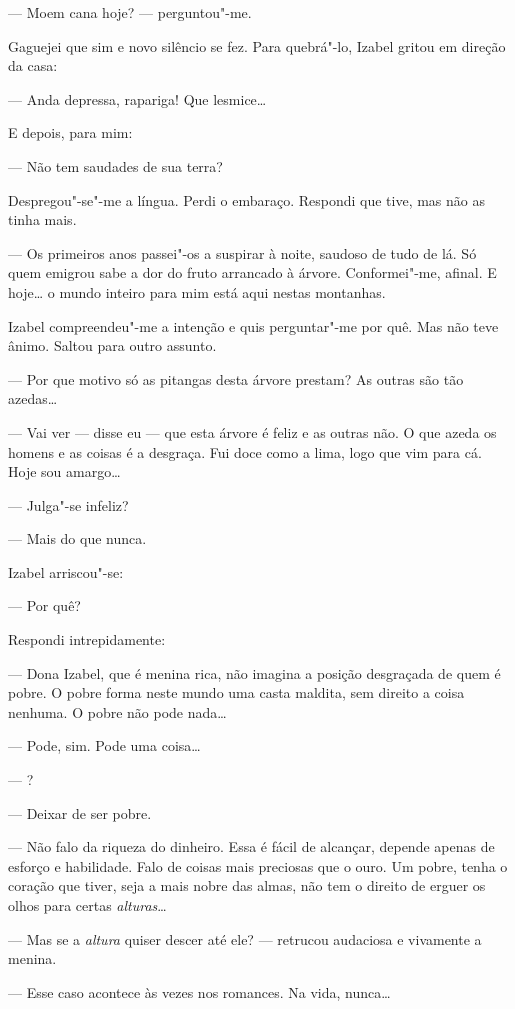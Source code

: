 --- Moem cana hoje? --- perguntou"-me.

Gaguejei que sim e novo silêncio se fez. Para quebrá"-lo, Izabel gritou
em direção da casa:

--- Anda depressa, rapariga! Que lesmice\ldots{}

E depois, para mim:

--- Não tem saudades de sua terra?

Despregou"-se"-me a língua. Perdi o embaraço. Respondi que tive, mas não
as tinha mais.

--- Os primeiros anos passei"-os a suspirar à noite, saudoso de tudo de
lá. Só quem emigrou sabe a dor do fruto arrancado à árvore.
Conformei"-me, afinal. E hoje\ldots{} o mundo inteiro para mim está aqui
nestas montanhas.

Izabel compreendeu"-me a intenção e quis perguntar"-me por quê. Mas não
teve ânimo. Saltou para outro assunto.

--- Por que motivo só as pitangas desta árvore prestam? As outras são
tão azedas\ldots{}

--- Vai ver --- disse eu --- que esta árvore é feliz e as outras não. O
que azeda os homens e as coisas é a desgraça. Fui doce como a lima, logo
que vim para cá. Hoje sou amargo\ldots{}

--- Julga"-se infeliz?

--- Mais do que nunca.

Izabel arriscou"-se:

--- Por quê?

Respondi intrepidamente:

--- Dona Izabel, que é menina rica, não imagina a posição desgraçada de
quem é pobre. O pobre forma neste mundo uma casta maldita, sem direito a
coisa nenhuma. O pobre não pode nada\ldots{}

--- Pode, sim. Pode uma coisa\ldots{}

--- ?

--- Deixar de ser pobre.

--- Não falo da riqueza do dinheiro. Essa é fácil de alcançar, depende
apenas de esforço e habilidade. Falo de coisas mais preciosas que o
ouro. Um pobre, tenha o coração que tiver, seja a mais nobre das almas,
não tem o direito de erguer os olhos para certas \emph{alturas}\ldots{}

--- Mas se a \emph{altura} quiser descer até ele? --- retrucou audaciosa
e vivamente a menina.

--- Esse caso acontece às vezes nos romances. Na vida, nunca\ldots{}

